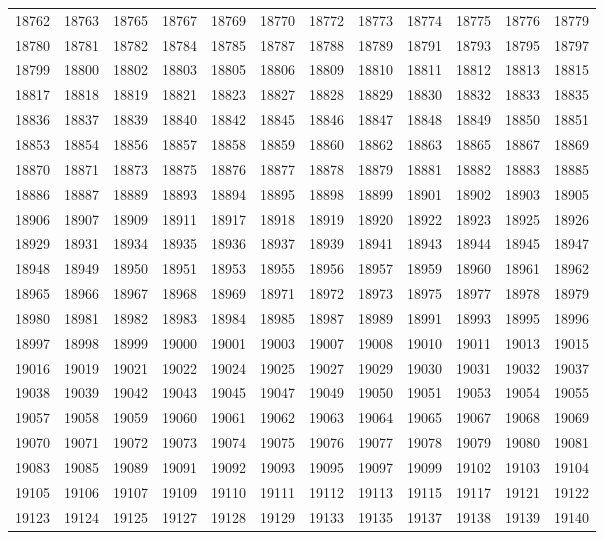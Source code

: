 \begin{center}
\begin{longtable}{llllllllllll}
18762 &18763 &18765 &18767 &18769 &18770 &18772 &18773 &18774 &18775 &18776 &18779 \\
18780 &18781 &18782 &18784 &18785 &18787 &18788 &18789 &18791 &18793 &18795 &18797 \\
18799 &18800 &18802 &18803 &18805 &18806 &18809 &18810 &18811 &18812 &18813 &18815 \\
18817 &18818 &18819 &18821 &18823 &18827 &18828 &18829 &18830 &18832 &18833 &18835 \\
18836 &18837 &18839 &18840 &18842 &18845 &18846 &18847 &18848 &18849 &18850 &18851 \\
18853 &18854 &18856 &18857 &18858 &18859 &18860 &18862 &18863 &18865 &18867 &18869 \\
18870 &18871 &18873 &18875 &18876 &18877 &18878 &18879 &18881 &18882 &18883 &18885 \\
18886 &18887 &18889 &18893 &18894 &18895 &18898 &18899 &18901 &18902 &18903 &18905 \\
18906 &18907 &18909 &18911 &18917 &18918 &18919 &18920 &18922 &18923 &18925 &18926 \\
18929 &18931 &18934 &18935 &18936 &18937 &18939 &18941 &18943 &18944 &18945 &18947 \\
18948 &18949 &18950 &18951 &18953 &18955 &18956 &18957 &18959 &18960 &18961 &18962 \\
18965 &18966 &18967 &18968 &18969 &18971 &18972 &18973 &18975 &18977 &18978 &18979 \\
18980 &18981 &18982 &18983 &18984 &18985 &18987 &18989 &18991 &18993 &18995 &18996 \\
18997 &18998 &18999 &19000 &19001 &19003 &19007 &19008 &19010 &19011 &19013 &19015 \\
19016 &19019 &19021 &19022 &19024 &19025 &19027 &19029 &19030 &19031 &19032 &19037 \\
19038 &19039 &19042 &19043 &19045 &19047 &19049 &19050 &19051 &19053 &19054 &19055 \\
19057 &19058 &19059 &19060 &19061 &19062 &19063 &19064 &19065 &19067 &19068 &19069 \\
19070 &19071 &19072 &19073 &19074 &19075 &19076 &19077 &19078 &19079 &19080 &19081 \\
19083 &19085 &19089 &19091 &19092 &19093 &19095 &19097 &19099 &19102 &19103 &19104 \\
19105 &19106 &19107 &19109 &19110 &19111 &19112 &19113 &19115 &19117 &19121 &19122 \\
19123 &19124 &19125 &19127 &19128 &19129 &19133 &19135 &19137 &19138 &19139 &19140 \\

\end{longtable}
\end{center}
